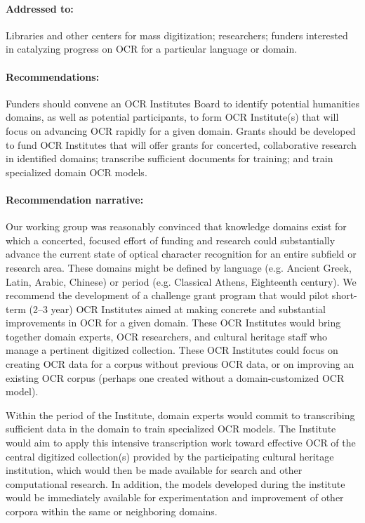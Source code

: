 \documentclass[twoside,11pt]{report}
\begin{document}
\paragraph{Addressed to:} Libraries and other centers for mass digitization; researchers; funders interested in catalyzing progress on OCR for a particular language or domain.

\paragraph{Recommendations:} Funders should convene an OCR Institutes Board to identify potential humanities domains, as well as potential participants, to form OCR Institute(s) that will focus on advancing OCR rapidly for a given domain. Grants should be developed to fund OCR Institutes that will offer grants for concerted, collaborative research in identified domains; transcribe sufficient documents for training; and train specialized domain OCR models.

\paragraph{Recommendation narrative:}

Our working group was reasonably convinced that knowledge domains exist for which a concerted, focused effort of funding and research could substantially advance the current state of optical character recognition for an entire subfield or research area. These domains might be defined by language (e.g. Ancient Greek, Latin, Arabic, Chinese) or period (e.g. Classical Athens, Eighteenth century). We recommend the development of a challenge grant program that would pilot short-term (2--3 year) OCR Institutes aimed at making concrete and substantial improvements in OCR for a given domain. These OCR Institutes would bring together domain experts, OCR researchers, and cultural heritage staff who manage a pertinent digitized collection. These OCR Institutes could focus on creating OCR data for a corpus without previous OCR data, or on improving an existing OCR corpus (perhaps one created without a domain-customized OCR model).

Within the period of the Institute, domain experts would commit to transcribing sufficient data in the domain to train specialized OCR models. The Institute would aim to apply this intensive transcription work toward effective OCR of the central digitized collection(s) provided by the participating cultural heritage institution, which would then be made available for search and other computational research. In addition, the models developed during the institute would be immediately available for experimentation and improvement of other corpora within the same or neighboring domains.
\end{document}
